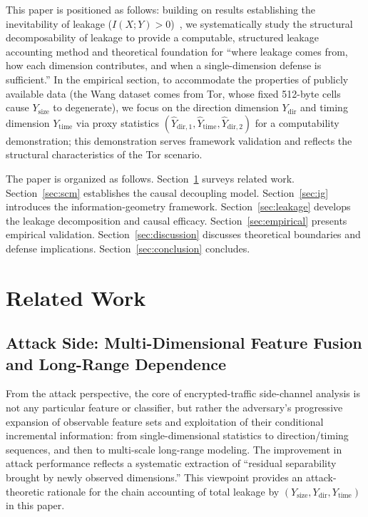 \documentclass[lettersize,journal]{IEEEtran}
\begin{document}
This paper is positioned as follows: building on results establishing the
inevitability of leakage ($I(X;Y)>0$)~\cite{liu2026inevitability}, we
systematically study the structural decomposability of leakage to provide a
computable, structured leakage accounting method and theoretical foundation
for ``where leakage comes from, how each dimension contributes, and when a
single-dimension defense is sufficient.''
In the empirical section, to accommodate the properties of publicly
available data (the Wang dataset comes from Tor, whose fixed 512-byte
cells cause $Y_{\mathrm{size}}$ to degenerate), we focus on the
direction dimension $Y_{\mathrm{dir}}$ and timing dimension
$Y_{\mathrm{time}}$ via proxy statistics
$(\hat{Y}_{\mathrm{dir},1}, \hat{Y}_{\mathrm{time}},
\hat{Y}_{\mathrm{dir},2})$ for a computability demonstration; this
demonstration serves framework validation and reflects the structural
characteristics of the Tor scenario.

The paper is organized as follows. Section~\ref{sec:related} surveys
related work. Section~\ref{sec:scm} establishes the causal decoupling
model. Section~\ref{sec:ig} introduces the information-geometry framework.
Section~\ref{sec:leakage} develops the leakage decomposition and causal
efficacy. Section~\ref{sec:empirical} presents empirical validation.
Section~\ref{sec:discussion} discusses theoretical boundaries and defense
implications. Section~\ref{sec:conclusion} concludes.

\section{Related Work}\label{sec:related}

\subsection{Attack Side: Multi-Dimensional Feature Fusion and Long-Range Dependence}

From the attack perspective, the core of encrypted-traffic side-channel
analysis is not any particular feature or classifier, but rather the
adversary's progressive expansion of observable feature sets and
exploitation of their conditional incremental information: from
single-dimensional statistics to direction/timing sequences, and then to
multi-scale long-range modeling.
The improvement in attack performance reflects a systematic extraction of
``residual separability brought by newly observed dimensions.''
This viewpoint provides an attack-theoretic rationale for the chain
accounting of total leakage by $(Y_{\mathrm{size}},
Y_{\mathrm{dir}}, Y_{\mathrm{time}})$ in this paper.
\end{document}
